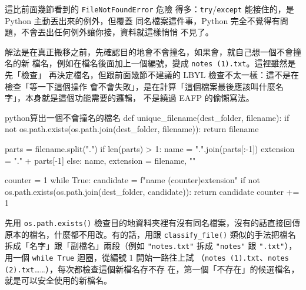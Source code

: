 這比前面幾節看到的 \texttt{FileNotFoundError} 危險
得多：\texttt{try}/\texttt{except} 能接住的，是 Python 主動丟出來的例外，但覆蓋
同名檔案這件事，Python 完全不覺得有問題，不會丟出任何例外讓你接，資料就這樣悄悄
不見了。


解法是在真正搬移之前，先確認目的地會不會撞名，如果會，就自己想一個不會撞名的新
檔名，例如在檔名後面加上一個編號，變成 \texttt{notes (1).txt}。這裡雖然是先「檢查」
再決定檔名，但跟前面幾節不建議的 LBYL 檢查不太一樣：這不是在檢查「等一下這個操作
會不會失敗」，是在計算「這個檔案最後應該叫什麼名字」，本身就是這個功能需要的邏輯，
不是繞過 EAFP 的偷懶寫法。

\begin{code}{python}{算出一個不會撞名的檔名}
def unique_filename(dest_folder, filename):
    if not os.path.exists(os.path.join(dest_folder, filename)):
        return filename

    parts = filename.split(".")
    if len(parts) > 1:
        name = ".".join(parts[:-1])
        extension = "." + parts[-1]
    else:
        name, extension = filename, ""

    counter = 1
    while True:
        candidate = f"{name} ({counter}){extension}"
        if not os.path.exists(os.path.join(dest_folder, candidate)):
            return candidate
        counter += 1
\end{code}

先用 \texttt{os.path.exists()} 檢查目的地資料夾裡有沒有同名檔案，沒有的話直接回傳
原本的檔名，什麼都不用改。有的話，用跟 \texttt{classify\_file()} 類似的手法把檔名
拆成「名字」跟「副檔名」兩段（例如 \texttt{"notes.txt"} 拆成 \texttt{"notes"} 跟
\texttt{".txt"}），用一個 \texttt{while True} 迴圈，從編號 1 開始一路往上試
（\texttt{notes (1).txt}、\texttt{notes (2).txt}……），每次都檢查這個新檔名存不存
在，第一個「不存在」的候選檔名，就是可以安全使用的新檔名。

